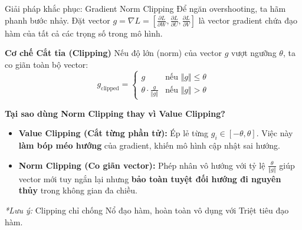 \documentclass[aspectratio=169, 10pt]{beamer}
\begin{document}
\begin{frame}{Giải pháp khắc phục: Gradient Norm Clipping}
\footnotesize
Để ngăn overshooting, ta hãm phanh bước nhảy. Đặt vector $g = \nabla L = \left[ \frac{\partial L}{\partial W}, \frac{\partial L}{\partial U}, \frac{\partial L}{\partial V} \right]$ là vector gradient chứa đạo hàm của tất cả các trọng số trong mô hình.

\vspace{0.05cm}
\begin{exampleblock}{\textbf{Cơ chế Cắt tỉa (Clipping)}}
Nếu độ lớn (norm) của vector $g$ vượt ngưỡng $\theta$, ta co giãn toàn bộ vector:
\[ g_{\text{clipped}} = \begin{cases} 
g & \text{nếu } \Vert g \Vert \le \theta \\
\theta \cdot \frac{g}{\Vert g \Vert} & \text{nếu } \Vert g \Vert > \theta 
\end{cases} \]
\end{exampleblock}

\vspace{0.05cm}
\begin{alertblock}{\textbf{Tại sao dùng Norm Clipping thay vì Value Clipping?}}
\begin{itemize}
    \item \textbf{Value Clipping (Cắt từng phần tử):} Ép lẻ từng $g_i \in [-\theta, \theta]$. Việc này \textbf{làm bóp méo hướng} của gradient, khiến mô hình cập nhật sai hướng.
    \item \textbf{Norm Clipping (Co giãn vector):} Phép nhân vô hướng với tỷ lệ $\frac{\theta}{\Vert g \Vert}$ giúp vector mới tuy ngắn lại nhưng \textbf{bảo toàn tuyệt đối hướng đi nguyên thủy} trong không gian đa chiều.
\end{itemize}
\end{alertblock}

\vspace{0.05cm}
\textit{\textcolor{crimsonred}{*Lưu ý:}} Clipping chỉ chống Nổ đạo hàm, hoàn toàn vô dụng với Triệt tiêu đạo hàm.
\end{frame}
\end{document}
